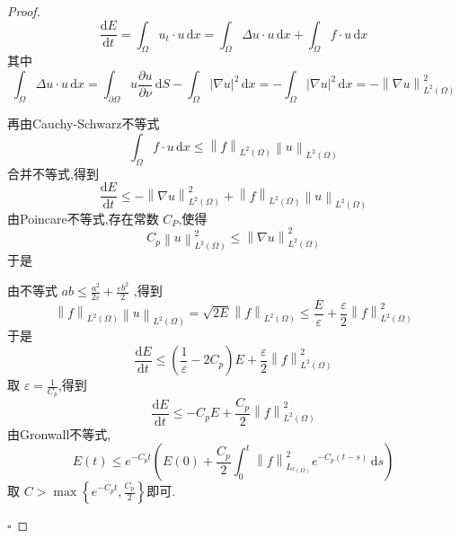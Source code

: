 \documentclass[../../main.tex]{subfiles}
\begin{document}
\begin{proof}
    \[
    \frac{\mathrm{d}E}{\mathrm{d}t} =  \int_{ \Omega } u_{t}\cdot u \,\mathrm{d} x=  \int_{ \Omega } \Delta u \cdot u\,\mathrm{d} x+  \int_{ \Omega }f \cdot u\,\mathrm{d} x
    \]其中 \[
    \int_{ \Omega } \Delta u\cdot u\,\mathrm{d} x= \int_{  \partial  \Omega  } u\frac{\partial u}{\partial \nu }\,\mathrm{d} S- \int_{ \Omega } \left|  \nabla u \right|^{2}\,\mathrm{d} x= -  \int_{ \Omega }\left|  \nabla u \right|^{2}\,\mathrm{d} x  = -\left\|  \nabla u \right\|_{L^{2}\left(  \Omega  \right) }^{2}
    \]

    再由Cauchy-Schwarz不等式 \[
    \int_{ \Omega }f\cdot u\,\mathrm{d} x\le  \left\| f \right\|_{L^{2}\left(  \Omega  \right) } \left\| u \right\|_{L^{2}\left(  \Omega  \right) }
    \]合并不等式,得到 \[
    \frac{\mathrm{d}E}{\mathrm{d}t}\le - \left\|  \nabla u \right\|^{2}_{L^{2}\left(  \Omega  \right) } + \left\| f \right\|_{L^{2}\left(  \Omega  \right) }\left\| u \right\|_{L^{2}\left(  \Omega  \right) }
    \]由Poincare不等式,存在常数 \(  C_{P}  \),使得 \[
    C_{p}\left\| u \right\|^{2}_{L^{2}\left(  \Omega  \right) }\le \left\|  \nabla u \right\|_{L^{2}\left(  \Omega  \right) }^{2}
    \] 于是 
    
    由不等式 \(  ab\le \frac{ a^{2}}{2 \varepsilon  }   + \frac{ \varepsilon b^{2} }{2 } \) ,得到 \[ \left\| f \right\|_{L^{2}\left(  \Omega  \right) }\left\| u \right\|_{L^{2}\left(  \Omega  \right) }= 
    \sqrt{2E} \left\| f \right\|_{L^{2}\left(  \Omega  \right) }\le   \frac{E }{ \varepsilon  }+ \frac{ \varepsilon  }{2 } \left\| f \right\|^{2}_{L^{2}\left(  \Omega  \right) }  
    \]于是 \[
    \frac{\mathrm{d}E}{\mathrm{d}t}\le \left( \frac{1 }{ \varepsilon  }-2C_{p}  \right)E + \frac{ \varepsilon  }{2 }\left\| f \right\|^{2}_{L^{2}\left(  \Omega  \right) }  
    \]取 \(   \varepsilon = \frac{1 }{C_{p} }   \),得到 \[
    \frac{\mathrm{d}E}{\mathrm{d}t}\le -C_{p}E+ \frac{C_{p} }{2 }\left\| f \right\|^{2}_{L^{2}\left(  \Omega  \right) } 
    \]由Gronwall不等式, \[
    E\left( t \right)\le e^{-C_{p}t}\left( E\left( 0 \right)+  \frac{C_{p} }{2 } \int_{0}^{t}\left\| f \right\|^{2}_{L_{^{2}\left(  \Omega  \right) }}e^{-C_{p}\left( t-s \right) }  \,\mathrm{d} s \right)  
    \] 取 \(  C> \max \left\{ e^{-C_{p}t}, \frac{C_{p} }{2 }  \right\}  \)即可. 

    
    \hfill $\square$
\end{proof}
\end{document}
